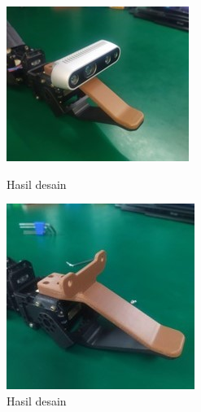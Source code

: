 \begin{figure}[h]
    \centering
    \begin{minipage}{0.36\columnwidth}
        \centering
        \includegraphics[width=\linewidth]{gambar/hasil mounting realsense.jpg}
        \caption{Hasil desain}
        \label{fig:realsense_mount2}
    \end{minipage}
    \hfill
    \begin{minipage}{0.36\columnwidth}
        \centering
        \includegraphics[width=\linewidth]{gambar/hasil mounting realsense 2.jpg}
        \caption{Hasil desain}
        \label{fig:realsense_mount3}
    \end{minipage}
\end{figure}


